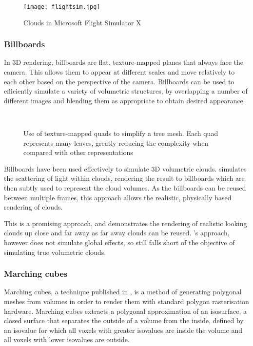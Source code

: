 \begin{figure}
\centering
	\texttt{[image: flightsim.jpg]}
	\caption{Clouds in Microsoft Flight Simulator X}
	\label{fig:flight_sim_clouds}
\end{figure}

\subsubsection{Billboards}
In 3D rendering, billboards are flat, texture-mapped planes that always face the camera. This allows them to appear at different scales and move relatively to each other based on the perspective of the camera. Billboards can be used to efficiently simulate a variety of volumetric structures, by overlapping a number of different images and blending them as appropriate to obtain desired appearance.

\begin{figure}
\centering
	\centering
	~

	\caption{Use of texture-mapped quads to simplify a tree mesh. Each quad represents many leaves, greatly reducing the complexity when compared with other representations}
	\label{fig:billboard_tree_quality}
\end{figure}

Billboards have been used effectively to simulate 3D volumetric clouds. \cite{harris02real} simulates the scattering of light within clouds, rendering the result to billboards which are then subtly used to represent the cloud volumes. As the billboards can be reused between multiple frames, this approach allows the realistic, physically based rendering of clouds.

This is a promising approach, and demonstrates the rendering of realistic looking clouds up close and far away as far away clouds can be reused. \citeauthor{harris02real}'s approach, however does not simulate global effects, so still falls short of the objective of simulating true volumetric clouds.

\subsubsection{Marching cubes}
Marching cubes, a technique published in \cite{lorensen87marchingcubes}, is a method of generating polygonal meshes from volumes in order to render them with standard polygon rasterisation hardware. Marching cubes extracts a polygonal approximation of an isosurface, a closed surface that separates the outside of a volume from the inside, defined by an isovalue for which all voxels with greater isovalues are inside the volume and all voxels with lower isovalues are outside.

